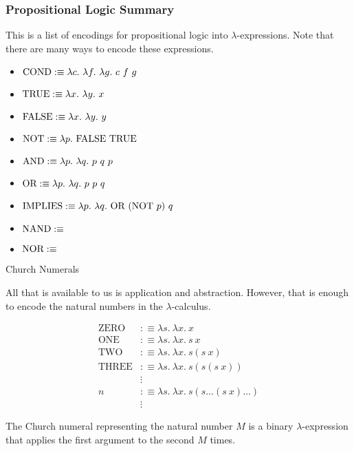 \documentclass{beamer}
\begin{document}
\begin{frame}
	\frametitle{Propositional Logic Summary}

	This is a list of encodings for propositional logic into $\lambda$-expressions. Note that there are many ways to encode these expressions.

	\vspace{0.5cm}

	\begin{itemize}
		\item[] $\text{COND} :\equiv \lambda c. \ \lambda f. \ \lambda g. \ c \ f \ g$
		\item[] $\text{TRUE} :\equiv \lambda x. \ \lambda y. \ x$
		\item[] $\text{FALSE} :\equiv \lambda x. \ \lambda y. \ y$
		\item[] $\NOT :\equiv \lambda p. \ \FALSE \ \TRUE$
		\item[] $\AND :\equiv \lambda p. \ \lambda q. \ p \ q \ p$
		\item[] $\OR :\equiv \lambda p. \ \lambda q. \ p \ p \ q$
		\item[] $\IMP :\equiv \lambda p. \ \lambda q. \ \OR \ (\text{NOT} \ p) \ q$
		\item[] $\text{NAND} :\equiv $
		\item[] $\text{NOR} :\equiv $

	\end{itemize}

\end{frame}

\begin{frame}{Church Numerals}

    All that is available to us is application and abstraction. However, that is enough to encode the natural numbers in the $\lambda$-calculus. 
    
    \begin{align*}
        \text{ZERO} &:\equiv \lambda s. \ \lambda x. \ x \\
        \text{ONE} &:\equiv \lambda s. \ \lambda x. \ s \ x \\
        \text{TWO} &:\equiv \lambda s. \ \lambda x. \ s(s \ x) \\
        \text{THREE} &:\equiv \lambda s. \ \lambda x. \ s(s(s \ x)) \\
        &\vdots \\
        n &:\equiv \lambda s. \ \lambda x. \ s(s \dots (s \ x) \dots ) \\
        &\vdots
    \end{align*}
        
    The Church numeral representing the natural number $M$ is a binary $\lambda$-expression that applies the first argument to the second $M$ times.    

\end{frame}
\end{document}

